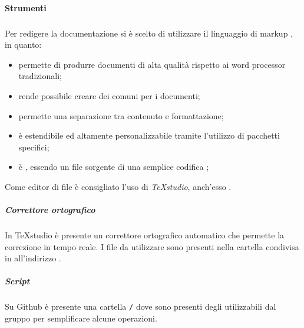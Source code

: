 	\paragraph{Strumenti}
	\label{sec:3.1.2.7}
		\subparagraph{\gl{\LaTeX}}
		\label{sec:3.1.2.7.1}
			Per redigere la documentazione si è scelto di utilizzare il linguaggio di markup \gl{\LaTeX}, in quanto: \\
			\begin{itemize} 
				\item permette di produrre documenti di alta qualità rispetto ai word processor tradizionali; 
				\item rende possibile creare dei  comuni per i documenti;
				\item permette una separazione tra contenuto e formattazione;
				\item è estendibile ed altamente personalizzabile tramite l'utilizzo di pacchetti specifici;
				\item è , essendo un file sorgente di \gl{\LaTeX} una semplice codifica ;
				\end{itemize}
				Come editor di file  è consigliato l'uso di \textit{TeXstudio}, anch'esso .	
		\subparagraph{Correttore ortografico}
		\label{sec:3.1.2.7.2}
			In TeXstudio è presente un correttore ortografico automatico che permette la correzione in tempo reale. I file da utilizzare sono presenti nella cartella condivisa in  all'indirizzo .
		\subparagraph{Script}
		\label{sec:3.1.2.7.3}
			Su Github è presente una cartella \texttt{/} dove sono presenti degli  utilizzabili dal gruppo per semplificare alcune operazioni.